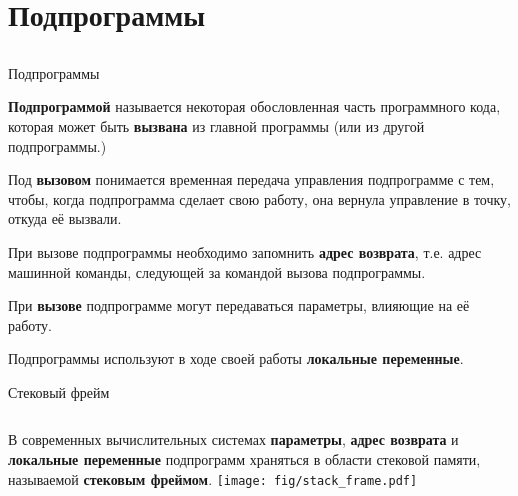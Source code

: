 \documentclass[utf8, russian]{beamer}
\begin{document}
    \section{Подпрограммы}
    \subsection{}
    \begin{frame}{Подпрограммы}

        {\bf Подпрограммой} называется некоторая обословленная часть программного кода, которая может быть {\bf вызвана} из главной программы (или из другой подпрограммы.)
        \bigskip

        Под {\bf вызовом} понимается временная передача управления подпрограмме с тем, чтобы, когда подпрограмма сделает свою работу, она вернула управление в точку, откуда её вызвали.

        \bigskip
        При вызове подпрограммы необходимо запомнить {\bf адрес возврата}, т.е. адрес машинной команды, следующей за командой вызова подпрограммы.
        \bigskip

        При {\bf вызове} подпрограмме могут передаваться параметры, влияющие на её работу.
        \bigskip

        Подпрограммы используют в ходе своей работы {\bf локальные переменные}.
    \end{frame}
    \begin{frame}{Стековый фрейм}
        \begin{columns}
        В современных вычислительных системах {\bf параметры}, {\bf адрес возврата} и {\bf локальные переменные} подпрограмм храняться в области стековой памяти, называемой {\bf стековым фреймом}.
        \texttt{[image: fig/stack\_frame.pdf]}
        \end{columns}
    \end{frame}
\end{document}
